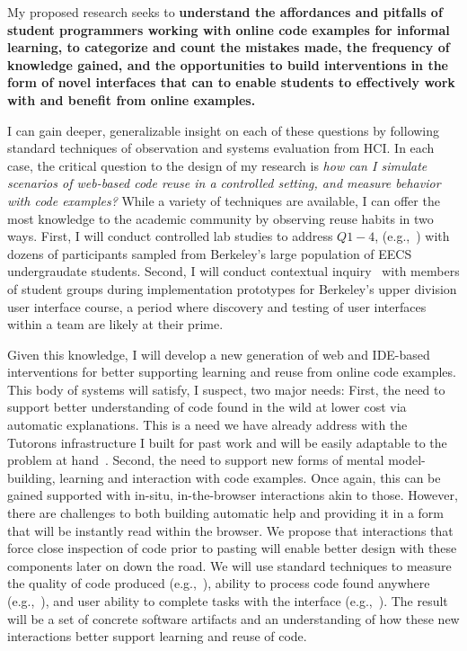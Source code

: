 \documentclass[12pt]{memoir}
\begin{document}

My proposed research seeks to \textbf{understand the affordances and pitfalls of student programmers working with online code examples for informal learning, to categorize and count the mistakes made, the frequency of knowledge gained, and the opportunities to build interventions in the form of novel interfaces that can to enable students to effectively work with and benefit from online examples.}


I can gain deeper, generalizable insight on each of these questions by following standard techniques of observation and systems evaluation from HCI\@.
In each case, the critical question to the design of my research is \emph{how can I simulate scenarios of web-based code reuse in a controlled setting, and measure behavior with code examples?}
While a variety of techniques are available, I can offer the most knowledge to the academic community by observing reuse habits in two ways.
First, I will conduct controlled lab studies to address $Q1-4$, (e.g.,~\cite{ichinco_exploring_2015,brandt_two_2009,head_tutorons_2015}) with dozens of participants sampled from Berkeley's large population of EECS undergraudate students.
Second, I will conduct contextual inquiry~\cite{beyer_contextual_1997} with members of student groups during implementation prototypes for Berkeley's upper division user interface course, a period where discovery and testing of user interfaces within a team are likely at their prime.

Given this knowledge, I will develop a new generation of web and IDE-based interventions for better supporting learning and reuse from online code examples.
This body of systems will satisfy, I suspect, two major needs:
First, the need to support better understanding of code found in the wild at lower cost via automatic explanations.
This is a need we have already address with the Tutorons infrastructure I built for past work and will be easily adaptable to the problem at hand~\cite{head_tutorons_2015}.
Second, the need to support new forms of mental model-building, learning and interaction with code examples.
Once again, this can be gained supported with in-situ, in-the-browser interactions akin to those.
However, there are challenges to both building automatic help and providing it in a form that will be instantly read within the browser.
We propose that interactions that force close inspection of code prior to pasting will enable better design with these components later on down the road.
We will use standard techniques to measure the quality of code produced (e.g.,~\cite{brandt_example-centric_2010}), ability to process code found anywhere (e.g.,~\cite{head_tutorons_2015}), and user ability to complete tasks with the interface (e.g.,~\cite{head_tutorons_2015}).
The result will be a set of concrete software artifacts and an understanding of how these new interactions better support learning and reuse of code.
\end{document}
